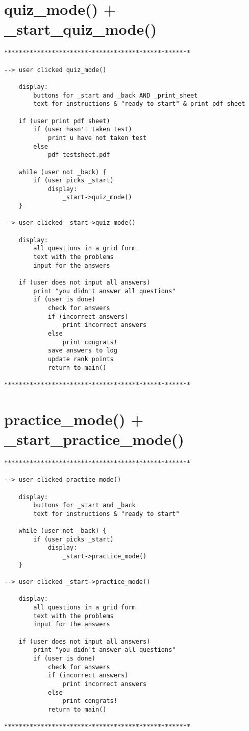 \documentclass[12pt]{article}
\begin{document}
\section{quiz\_mode() + \_start\_quiz\_mode()}
    \begin{verbatim}
***************************************************

--> user clicked quiz_mode()

    display:
        buttons for _start and _back AND _print_sheet
        text for instructions & "ready to start" & print pdf sheet
    
    if (user print pdf sheet)
        if (user hasn't taken test)
            print u have not taken test
        else
            pdf testsheet.pdf

    while (user not _back) {
        if (user picks _start)
            display:
                _start->quiz_mode()
    }

--> user clicked _start->quiz_mode()

    display:
        all questions in a grid form
        text with the problems
        input for the answers

    if (user does not input all answers)
        print "you didn't answer all questions"
        if (user is done)
            check for answers
            if (incorrect answers)
                print incorrect answers
            else
                print congrats!
            save answers to log
            update rank points
            return to main()

***************************************************
    \end{verbatim}

\newpage

\section{practice\_mode() + \_start\_practice\_mode()}
    \begin{verbatim}
***************************************************

--> user clicked practice_mode()

    display:
        buttons for _start and _back
        text for instructions & "ready to start"
    
    while (user not _back) {
        if (user picks _start)
            display:
                _start->practice_mode()
    }

--> user clicked _start->practice_mode()

    display:
        all questions in a grid form
        text with the problems
        input for the answers

    if (user does not input all answers)
        print "you didn't answer all questions"
        if (user is done)
            check for answers
            if (incorrect answers)
                print incorrect answers
            else
                print congrats!
            return to main()

***************************************************
    \end{verbatim}
\end{document}
